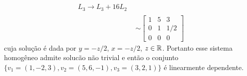 \begin{exemplos}
\begin{enumerate}
\begin{align*}
        \begin{array}{l}
          \phantom{x}\\\phantom{x}\\L_3 \to L_3 + 16L_2
        \end{array}\\&\sim
        \begin{bmatrix}
          1 & 5 & 3\\
          0 & 1 & 1/2\\
          0 & 0 & 0
        \end{bmatrix}
      \end{align*}
      cuja solução é dada por $y = -z/2$, $x =-z/2$, $z \in \mathbb{R}$. Portanto esse
      sistema homogêneo admite solucão não trivial e então o conjunto
      $\{v_1 = (1, -2, 3), v_2 = (5, 6, -1), v_3 = (3, 2, 1)\}$ é linearmente dependente.


\end{enumerate}
\end{exemplos}
